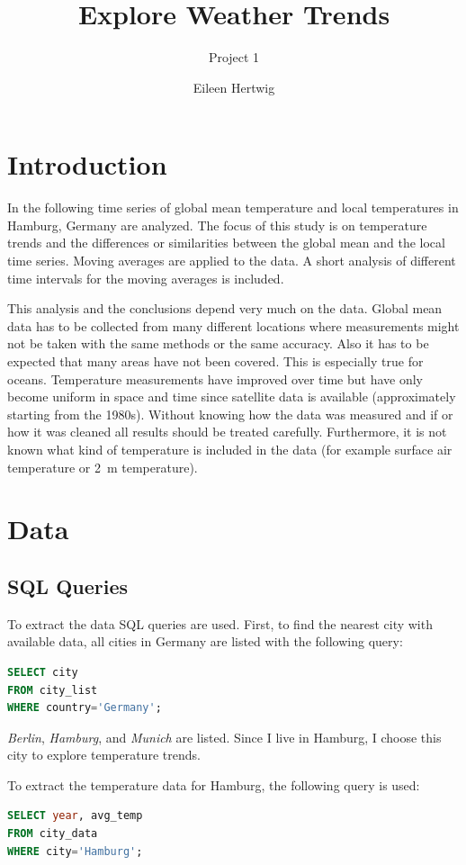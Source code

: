 \documentclass[a4paper]{scrartcl}
\title{Explore Weather Trends}
\author{Eileen Hertwig}
\subtitle{Project 1}
\begin{document}
\maketitle

\section{Introduction}

In the following time series of global mean temperature and local temperatures in Hamburg, Germany are analyzed. 
The focus of this study is on temperature trends and the differences or similarities between the global mean and the local time series. 
Moving averages are applied to the data. 
A short analysis of different time intervals for the moving averages is included. 

This analysis and the conclusions depend very much on the data. 
Global mean data has to be collected from many different locations where measurements might not be taken with the same methods or the same accuracy. 
Also it has to be expected that many areas have not been covered. 
This is especially true for oceans. 
Temperature measurements have improved over time but have only become uniform in space and time since satellite data is available (approximately starting from the 1980s). 
Without knowing how the data was measured and if or how it was cleaned all results should be treated carefully. 
Furthermore, it is not known what kind of temperature is included in the data (for example surface air temperature or 2~m temperature). 

\section{Data}
\subsection{SQL Queries}
To extract the data SQL queries are used. 
First, to find the nearest city with available data, all cities in Germany are listed with the following query:
\begin{lstlisting}[language=sql]
SELECT city
FROM city_list
WHERE country='Germany';
\end{lstlisting}
\textit{Berlin}, \textit{Hamburg}, and \textit{Munich} are listed. 
Since I live in Hamburg, I choose this city to explore temperature trends. 

To extract the temperature data for Hamburg, the following query is used:
\begin{lstlisting}[language=sql]
SELECT year, avg_temp
FROM city_data
WHERE city='Hamburg';
\end{lstlisting}
\end{document}
